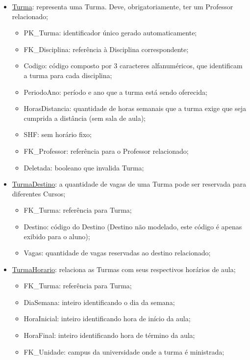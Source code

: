 \documentclass[graduacao,brazil]{ThesisPUC}
\begin{document}
\begin{itemize}
	\item \underline{Turma}: representa uma Turma. Deve, obrigatoriamente, ter um Professor relacionado;
	\begin{itemize}
		\item PK\_Turma: identificador único gerado automaticamente;
		\item FK\_Disciplina: referência à Disciplina correspondente;
		\item Codigo: código composto por 3 caracteres alfanuméricos, que identificam a turma para cada disciplina;
		\item PeriodoAno: período e ano que a turma está sendo oferecida;
		\item HorasDistancia: quantidade de horas semanais que a turma exige que seja cumprida a distância (sem sala de aula);
		\item SHF: sem horário fixo;
		\item FK\_Professor: referência para o Professor relacionado;
		\item Deletada: booleano que invalida Turma;
	\end{itemize}

	\item \underline{TurmaDestino}: a quantidade de vagas de uma Turma pode ser reservada para diferentes Cursos;
	\begin{itemize}
		\item FK\_Turma: referência para Turma;
		\item Destino: código do Destino (Destino não modelado, este código é apenas exibido para o aluno);
		\item Vagas: quantidade de vagas reservadas ao destino relacionado;
	\end{itemize}

	\item \underline{TurmaHorario}: relaciona as Turmas com seus respectivos horários de aula;
	\begin{itemize}
		\item FK\_Turma: referência para Turma;
		\item DiaSemana: inteiro identificando o dia da semana;
		\item HoraInicial: inteiro identificando hora de início da aula;
		\item HoraFinal: inteiro identificando hora de término da aula;
		\item FK\_Unidade: campus da universidade onde a turma é ministrada;
	\end{itemize}


\end{itemize}
\end{document}
